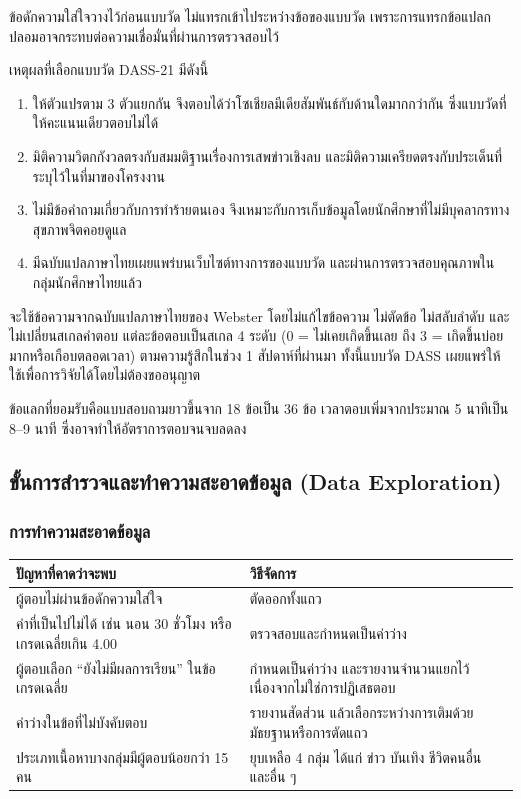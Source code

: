 ข้อดักความใส่ใจวางไว้ก่อนแบบวัด ไม่แทรกเข้าไประหว่างข้อของแบบวัด
เพราะการแทรกข้อแปลกปลอมอาจกระทบต่อความเชื่อมั่นที่ผ่านการตรวจสอบไว้

เหตุผลที่เลือกแบบวัด DASS-21 มีดังนี้

\begin{enumerate}[label=\arabic*),leftmargin=1.9cm,itemsep=0.15em,topsep=0.2em]
    \item ให้ตัวแปรตาม 3 ตัวแยกกัน จึงตอบได้ว่าโซเชียลมีเดียสัมพันธ์กับด้านใดมากกว่ากัน ซึ่งแบบวัดที่ให้คะแนนเดียวตอบไม่ได้
    \item มิติความวิตกกังวลตรงกับสมมติฐานเรื่องการเสพข่าวเชิงลบ และมิติความเครียดตรงกับประเด็นที่ระบุไว้ในที่มาของโครงงาน
    \item ไม่มีข้อคำถามเกี่ยวกับการทำร้ายตนเอง จึงเหมาะกับการเก็บข้อมูลโดยนักศึกษาที่ไม่มีบุคลากรทางสุขภาพจิตคอยดูแล
    \item มีฉบับแปลภาษาไทยเผยแพร่บนเว็บไซต์ทางการของแบบวัด \cite{webster2008thai}
          และผ่านการตรวจสอบคุณภาพในกลุ่มนักศึกษาไทยแล้ว \cite{wittayapun2023validation}
\end{enumerate}

จะใช้ข้อความจากฉบับแปลภาษาไทยของ Webster \cite{webster2008thai}
โดยไม่แก้ไขข้อความ ไม่ตัดข้อ ไม่สลับลำดับ และไม่เปลี่ยนสเกลคำตอบ
แต่ละข้อตอบเป็นสเกล 4 ระดับ (0 = ไม่เคยเกิดขึ้นเลย ถึง 3 = เกิดขึ้นบ่อยมากหรือเกือบตลอดเวลา)
ตามความรู้สึกในช่วง 1 สัปดาห์ที่ผ่านมา
ทั้งนี้แบบวัด DASS เผยแพร่ให้ใช้เพื่อการวิจัยได้โดยไม่ต้องขออนุญาต

ข้อแลกที่ยอมรับคือแบบสอบถามยาวขึ้นจาก 18 ข้อเป็น 36 ข้อ
เวลาตอบเพิ่มจากประมาณ 5 นาทีเป็น 8--9 นาที ซึ่งอาจทำให้อัตราการตอบจนจบลดลง

\subsection{ขั้นการสำรวจและทำความสะอาดข้อมูล (Data Exploration)}

\subsubsection*{การทำความสะอาดข้อมูล}

\begin{table}[H]
\centering
\begin{tabularx}{\textwidth}{|L|L|}
\hline
\textbf{ปัญหาที่คาดว่าจะพบ} & \textbf{วิธีจัดการ} \\
\hline
ผู้ตอบไม่ผ่านข้อดักความใส่ใจ & ตัดออกทั้งแถว \\
\hline
ค่าที่เป็นไปไม่ได้ เช่น นอน 30 ชั่วโมง หรือเกรดเฉลี่ยเกิน 4.00 & ตรวจสอบและกำหนดเป็นค่าว่าง \\
\hline
ผู้ตอบเลือก ``ยังไม่มีผลการเรียน'' ในข้อเกรดเฉลี่ย & กำหนดเป็นค่าว่าง และรายงานจำนวนแยกไว้ เนื่องจากไม่ใช่การปฏิเสธตอบ \\
\hline
ค่าว่างในข้อที่ไม่บังคับตอบ & รายงานสัดส่วน แล้วเลือกระหว่างการเติมด้วยมัธยฐานหรือการตัดแถว \\
\hline
ประเภทเนื้อหาบางกลุ่มมีผู้ตอบน้อยกว่า 15 คน & ยุบเหลือ 4 กลุ่ม ได้แก่ ข่าว บันเทิง ชีวิตคนอื่น และอื่น ๆ \\
\hline
\end{tabularx}
\end{table}

